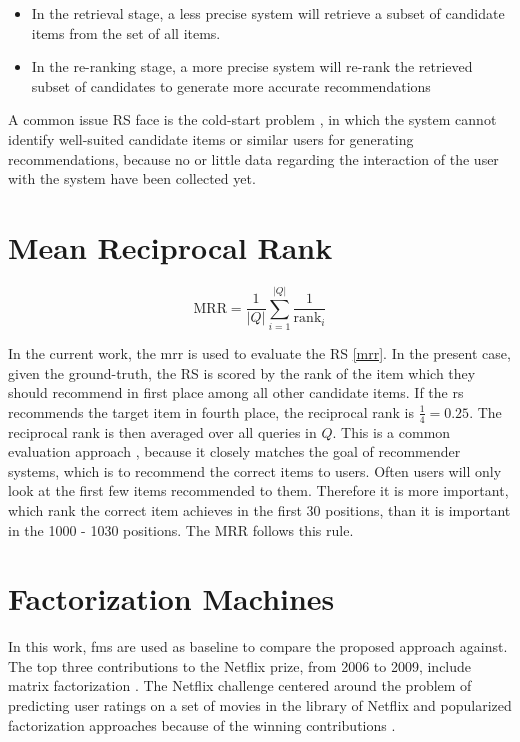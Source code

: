 \begin{itemize}
    \item In the retrieval stage, a less precise system will retrieve a subset of candidate items from the set of all items.
    \item In the re-ranking stage, a more precise system will re-rank the retrieved subset of candidates to generate more accurate recommendations   
\end{itemize}


A common issue RS face is the cold-start problem \parencite{alyari2018recommender}, in which the system cannot identify well-suited candidate items or similar users for generating recommendations, because no or little data regarding the interaction of the user with the system have been collected yet.

\section{Mean Reciprocal Rank}
\begin{equation}
\text{MRR} = \frac{1}{|Q|} \sum_{i=1}^{|Q|} \frac{1}{\text{rank}_{i}}
\label{mrr}
\end{equation}


In the current work, the \ac{mrr} is used to evaluate the RS \eqref{mrr}. In the present case, given the ground-truth, the RS is scored by the rank of the item which they should recommend in first place among all other candidate items. If the \ac{rs} recommends the target item in fourth place, the reciprocal rank is $\frac{1}{4}=0.25$.  The reciprocal rank is then averaged over all queries in $Q$. This is a common evaluation approach \parencite{ying2018graph}, because it closely matches the goal of recommender systems, which is to recommend the correct items to users. Often users will only look at the first few items recommended to them. Therefore it is more important, which rank the correct item achieves in the first 30 positions, than it is important in the 1000 - 1030 positions. The MRR follows this rule.
\newpage
\section{Factorization Machines}
In this work, \acp{fm} \parencite{rendle2010factorization} are used as baseline to compare the proposed approach against. The top three contributions to the Netflix prize, from 2006 to 2009, include matrix factorization \parencite{freudenthaler2009factorization}. The Netflix challenge centered around the problem of predicting user ratings on a set of movies in the library of Netflix and popularized factorization approaches because of the winning contributions \parencite{freudenthaler2009factorization}. 

